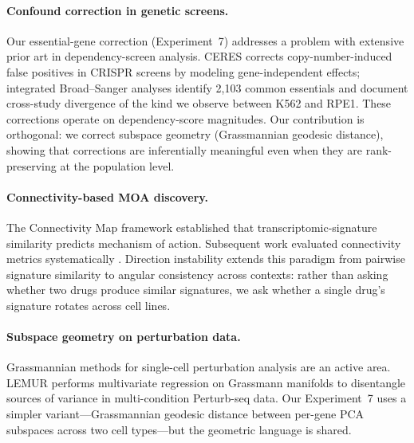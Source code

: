 \documentclass{article}
\begin{document}
\paragraph{Confound correction in genetic screens.}
Our essential-gene correction (Experiment~7) addresses a problem with
extensive prior art in dependency-screen analysis. CERES
\citep{meyers2017ceres} corrects copy-number-induced false positives in
CRISPR screens by modeling gene-independent effects; integrated
Broad--Sanger analyses \citep{pacini2021integrated} identify 2{,}103 common
essentials and document cross-study divergence of the kind we observe between
K562 and RPE1. These corrections operate on dependency-score magnitudes. Our
contribution is orthogonal: we correct subspace geometry (Grassmannian
geodesic distance), showing that corrections are inferentially meaningful
even when they are rank-preserving at the population level.

\paragraph{Connectivity-based MOA discovery.}
The Connectivity Map framework \citep{subramanian2017next,lamb2006connectivity}
established that transcriptomic-signature similarity predicts mechanism of
action. Subsequent work evaluated connectivity metrics systematically
\citep{li2020comprehensive}. Direction instability extends this paradigm from
pairwise signature similarity to angular consistency across contexts: rather
than asking whether two drugs produce similar signatures, we ask whether a
single drug's signature rotates across cell lines.

\paragraph{Subspace geometry on perturbation data.}
Grassmannian methods for single-cell perturbation analysis are an active
area. LEMUR \citep{ahlmanneltze2025lemur} performs multivariate regression on
Grassmann manifolds to disentangle sources of variance in multi-condition
Perturb-seq data. Our Experiment~7 uses a simpler variant---Grassmannian
geodesic distance between per-gene PCA subspaces across two cell types---but
the geometric language is shared.
\end{document}
